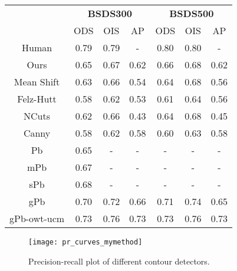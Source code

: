 \begin{table}[]
\centering
\begin{tabular}{c|c|c|c||c|c|c|}
\cline{2-7}
                                  & \multicolumn{3}{c||}{\textbf{BSDS300}} & \multicolumn{3}{c|}{\textbf{BSDS500}} \\ \cline{2-7} 
                                  & ODS         & OIS        & AP         & ODS         & OIS        & AP         \\ \hline
\multicolumn{1}{|c|}{Human}       & 0.79        & 0.79       & -          & 0.80        & 0.80       & -          \\ \hline
\multicolumn{1}{|c|}{Ours}        & 0.65        & 0.67       & 0.62       & 0.66        & 0.68       & 0.62       \\
\multicolumn{1}{|c|}{Mean Shift}  & 0.63        & 0.66       & 0.54       & 0.64        & 0.68       & 0.56       \\
\multicolumn{1}{|c|}{Felz-Hutt}   & 0.58        & 0.62       & 0.53       & 0.61        & 0.64       & 0.56       \\
\multicolumn{1}{|c|}{NCuts}       & 0.62        & 0.66       & 0.43       & 0.64        & 0.68       & 0.45       \\
\multicolumn{1}{|c|}{Canny}       & 0.58        & 0.62       & 0.58       & 0.60        & 0.63       & 0.58       \\
\multicolumn{1}{|c|}{Pb}          & 0.65        & -          & -          & -           & -          & -          \\ \hline
\multicolumn{1}{|c|}{mPb}         & 0.67        & -          & -          & -           & -          & -          \\
\multicolumn{1}{|c|}{sPb}         & 0.68        & -          & -          & -           & -          & -          \\
\multicolumn{1}{|c|}{gPb}         & 0.70        & 0.72       & 0.66       & 0.71        & 0.74       & 0.65       \\
\multicolumn{1}{|c|}{gPb-owt-ucm} & 0.73        & 0.76       & 0.73       & 0.73        & 0.76       & 0.73       \\ \hline
\end{tabular}
\end{table}


\begin{figure}[!ht]
	\centering
	\texttt{[image: pr\_curves\_mymethod]}
	\caption{Precision-recall plot of different contour detectors.}\label{fig:pr_curves}
\end{figure}


